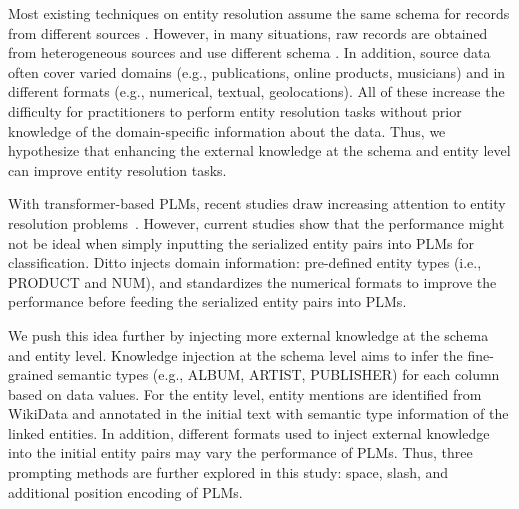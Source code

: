 Most existing techniques on entity resolution assume the same schema for records from different sources \cite{elmagarmid_duplicate_2007}. However, in many situations, raw records are obtained from heterogeneous sources and use different schema \cite{enriquez_entity_2017, arabnia_when_2021}. In addition, source data often cover varied domains (e.g., publications, online products, musicians) and in different formats (e.g., numerical, textual, geolocations). 
All of these increase the difficulty for practitioners to perform entity resolution tasks without prior knowledge of the domain-specific information about the data.
Thus, we hypothesize that enhancing the external knowledge at the schema and entity level can improve entity resolution tasks.  

With transformer-based PLMs, recent studies draw increasing attention to entity resolution problems~\cite{li_deep_2020, trabelsi_dame_2022}. However, current studies show that the performance might not be ideal when simply inputting the serialized entity pairs into PLMs for classification. Ditto \cite{li_deep_2020} injects domain information: pre-defined entity types (i.e., PRODUCT and NUM), and standardizes the numerical formats to improve the performance before feeding the serialized entity pairs into PLMs.

We push this idea further by injecting more external knowledge at the schema and entity level. Knowledge injection at the schema level aims to infer the fine-grained semantic types (e.g., ALBUM, ARTIST, PUBLISHER) for each column based on data values. 
For the entity level, entity mentions are identified from WikiData and annotated in the initial text with semantic type information of the linked entities. In addition, different formats used to inject external knowledge into the initial entity pairs may vary the performance of PLMs. Thus, three prompting methods are further explored in this study: space, slash, and additional position encoding of PLMs.


